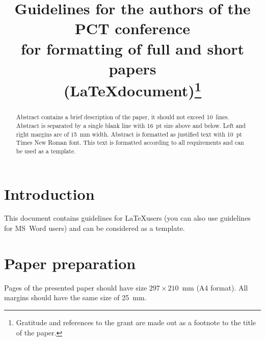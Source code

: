 \documentclass[11pt, oneside, a4paper]{article}
\begin{document}

\title{Guidelines for the authors of the PCT conference\\
for formatting of full and short papers \\
(\LaTeX document)\footnote{Gratitude and references to the grant are made out as a footnote to the title of the paper.}}


\begin{abstract}
Abstract contains a brief description of the paper, it should not exceed 10~lines. 
Abstract is separated by a single blank line with 16~pt size above and below. 
Left and right margins are of 15~mm width. Abstract is formatted as justified text 
with 10~pt Times New Roman font. This text is formatted according to all requirements 
and can be used as a template.
\end{abstract}



\section{Introduction}
This document contains guidelines for \LaTeX users 
(you can also use guidelines for MS~Word users) and can be considered as a template. 

\section{Paper preparation}
Pages of the presented paper should have size
$297 \times 210$~mm (A4 format). All margins should have the same size of 25~mm.
\end{document}
